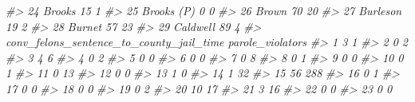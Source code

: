 \documentclass[
]{krantz}
\makeatletter
\newenvironment{Shaded}{\begin{snugshade}}{\end{snugshade}}
\newcommand{\CommentTok}[1]{\textcolor[rgb]{0.37,0.37,0.37}{\textit{#1}}}
\newenvironment{kframe}{%
\medskip{}
\setlength{\fboxsep}{.8em}
 \def\at@end@of@kframe{}%
 \ifinner\ifhmode%
  \def\at@end@of@kframe{\end{minipage}}%
  \begin{minipage}{\columnwidth}%
 \fi\fi%
 \def\FrameCommand##1{\hskip\@totalleftmargin \hskip-\fboxsep
 \colorbox{shadecolor}{##1}\hskip-\fboxsep
     \hskip-\linewidth \hskip-\@totalleftmargin \hskip\columnwidth}%
 \MakeFramed {\advance\hsize-\width
   \@totalleftmargin\z@ \linewidth\hsize
   \@setminipage}}%
 {\par\unskip\endMakeFramed%
 \at@end@of@kframe}
\renewenvironment{Shaded}{\begin{kframe}}{\end{kframe}}
\makeatother
\begin{document}
\begin{Shaded}
\begin{Highlighting}[]
\CommentTok{\#\textgreater{} 24     Brooks              15           1}
\CommentTok{\#\textgreater{} 25 Brooks (P)               0           0}
\CommentTok{\#\textgreater{} 26      Brown              70          20}
\CommentTok{\#\textgreater{} 27   Burleson              19           2}
\CommentTok{\#\textgreater{} 28     Burnet              57          23}
\CommentTok{\#\textgreater{} 29   Caldwell              89           4}
\CommentTok{\#\textgreater{}    conv\_felons\_sentence\_to\_county\_jail\_time parole\_violators}
\CommentTok{\#\textgreater{} 1                                         3                1}
\CommentTok{\#\textgreater{} 2                                         0                2}
\CommentTok{\#\textgreater{} 3                                         4                6}
\CommentTok{\#\textgreater{} 4                                         0                2}
\CommentTok{\#\textgreater{} 5                                         0                0}
\CommentTok{\#\textgreater{} 6                                         0                0}
\CommentTok{\#\textgreater{} 7                                         0                8}
\CommentTok{\#\textgreater{} 8                                         0                1}
\CommentTok{\#\textgreater{} 9                                         0                0}
\CommentTok{\#\textgreater{} 10                                        0                1}
\CommentTok{\#\textgreater{} 11                                        0               13}
\CommentTok{\#\textgreater{} 12                                        0                0}
\CommentTok{\#\textgreater{} 13                                        1                0}
\CommentTok{\#\textgreater{} 14                                        1               32}
\CommentTok{\#\textgreater{} 15                                       56              288}
\CommentTok{\#\textgreater{} 16                                        0                1}
\CommentTok{\#\textgreater{} 17                                        0                0}
\CommentTok{\#\textgreater{} 18                                        0                0}
\CommentTok{\#\textgreater{} 19                                        0                2}
\CommentTok{\#\textgreater{} 20                                       10               17}
\CommentTok{\#\textgreater{} 21                                        3               16}
\CommentTok{\#\textgreater{} 22                                        0                0}
\CommentTok{\#\textgreater{} 23                                        0                0}

\end{Highlighting}
\end{Shaded}
\end{document}
